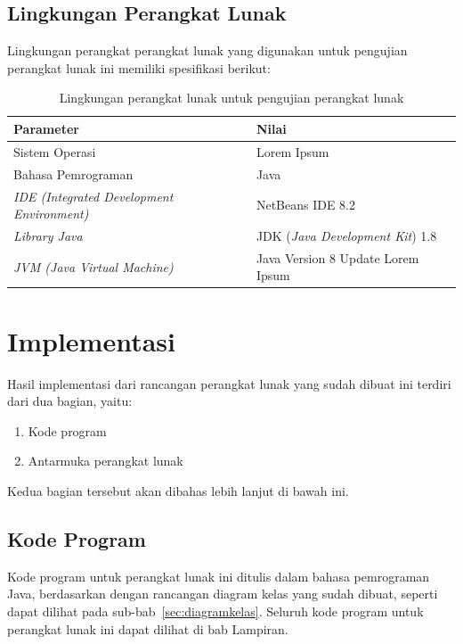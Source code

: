 \subsection{Lingkungan Perangkat Lunak}
\label{sec:lingkunganpl}

Lingkungan perangkat perangkat lunak yang digunakan untuk pengujian perangkat lunak ini memiliki spesifikasi berikut:

\begin{table}
\centering
\captionsetup{justification=centering}
\caption[Lingkungan perangkat lunak untuk pengujian perangkat lunak]{Lingkungan perangkat lunak untuk pengujian perangkat lunak}
\begin{tabular}{| l | l |}
\hline
Parameter & Nilai \\
\hline \hline
Sistem Operasi & Lorem Ipsum \\
\hline
Bahasa Pemrograman & Java \\
\hline
\textit{IDE (Integrated Development Environment)} & NetBeans IDE 8.2 \\
\hline
\textit{Library Java} & JDK (\textit{Java Development Kit}) 1.8 \\
\hline
\textit{JVM (Java Virtual Machine)} & Java Version 8 Update Lorem Ipsum \\
\hline
\end{tabular}
\label{tab:lingkunganpl}
\end{table}

\section{Implementasi}
\label{sec:implementasi}

Hasil implementasi dari rancangan perangkat lunak yang sudah dibuat ini terdiri dari dua bagian, yaitu:

\begin{enumerate}
\item Kode program
\item Antarmuka perangkat lunak
\end{enumerate}

Kedua bagian tersebut akan dibahas lebih lanjut di bawah ini.

\subsection{Kode Program}
\label{sec:kodeprogram}

Kode program untuk perangkat lunak ini ditulis dalam bahasa pemrograman Java, berdasarkan dengan rancangan diagram kelas yang sudah dibuat, seperti dapat dilihat pada sub-bab~\ref{sec:diagramkelas}. Seluruh kode program untuk perangkat lunak ini dapat dilihat di bab Lampiran.

